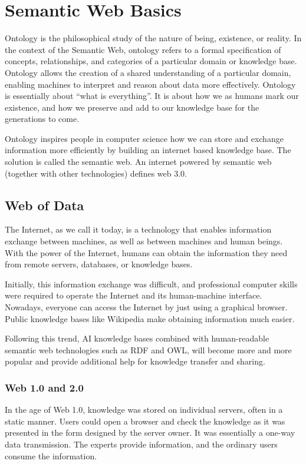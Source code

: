 \chapter{Semantic Web Basics} \label{ch:briefintrosemanticweb}

Ontology is the philosophical study of the nature of being, existence, or reality. In the context of the Semantic Web, ontology refers to a formal specification of concepts, relationships, and categories of a particular domain or knowledge base. Ontology allows the creation of a shared understanding of a particular domain, enabling machines to interpret and reason about data more effectively. Ontology is essentially about “what is everything”. It is about how we as humans mark our existence, and how we preserve and add to our knowledge base for the generations to come.

Ontology inspires people in computer science how we can store and exchange information more efficiently by building an internet based knowledge base. The solution is called the semantic web. An internet powered by semantic web (together with other technologies) defines web 3.0.

\section{Web of Data}

The Internet, as we call it today, is a technology that enables information exchange between machines, as well as between machines and human beings. With the power of the Internet, humans can obtain the information they need from remote servers, databases, or knowledge bases.

Initially, this information exchange was difficult, and professional computer skills were required to operate the Internet and its human-machine interface. Nowadays, everyone can access the Internet by just using a graphical browser. Public knowledge bases like Wikipedia make obtaining information much easier.

Following this trend, AI knowledge bases combined with human-readable semantic web technologies such as RDF and OWL, will become more and more popular and provide additional help for knowledge transfer and sharing.

\subsection{Web 1.0 and 2.0}

In the age of Web 1.0, knowledge was stored on individual servers, often in a static manner. Users could open a browser and check the knowledge as it was presented in the form designed by the server owner. It was essentially a one-way data transmission. The experts provide information, and the ordinary users consume the information.

